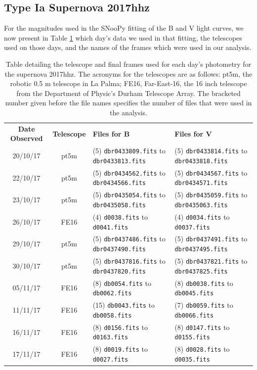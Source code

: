 \documentclass[twocolumn]{revtex4}
\begin{document}
{\subsection{Type Ia Supernova 2017hhz}
\vspace{-2ex}
For the magnitudes used in the SNooPy fitting of the B and V light curves, we now present in Table \ref{table:2017hhz_appendix_table} which day's data we used in that fitting, the telescopes used on those days, and the names of the frames which were used in our analysis. 
\begin{table}[h!]
\centering
\begin{tabularx}{\textwidth}{c@{\hskip 10pt}c@{\hskip 10pt}X X} 
 \hline
 \textbf{Date Observed} & \textbf{Telescope} & \textbf{Files for B} & \textbf{Files for V} \\ [0.5ex] 
 20/10/17 & pt5m & (5) \texttt{dbr0433809.fits} to \texttt{dbr0433813.fits} & (5) \texttt{dbr0433814.fits} to \texttt{dbr0433818.fits} \\
 22/10/17 & pt5m & (5) \texttt{dbr0434562.fits} to \texttt{dbr0434566.fits} & (5) \texttt{dbr0434567.fits} to \texttt{dbr0434571.fits} \\
 23/10/17 & pt5m & (5) \texttt{dbr0435054.fits} to \texttt{dbr0435058.fits} & (5) \texttt{dbr0435059.fits} to \texttt{dbr0435063.fits} \\
 26/10/17 & FE16 & (4) \texttt{d0038.fits} to \texttt{d0041.fits} & (4) \texttt{d0034.fits} to \texttt{d0037.fits} \\
 29/10/17 & pt5m & (5) \texttt{dbr0437486.fits} to \texttt{dbr0437490.fits} & (5) \texttt{dbr0437491.fits} to \texttt{dbr0437495.fits} \\
 30/10/17 & pt5m & (5) \texttt{dbr0437816.fits} to \texttt{dbr0437820.fits} & (5) \texttt{dbr0437821.fits} to \texttt{dbr0437825.fits} \\
 05/11/17 & FE16 & (8) \texttt{db0054.fits} to \texttt{db0062.fits} & (8) \texttt{db0038.fits} to \texttt{db0045.fits} \\
 11/11/17 & FE16 & (15) \texttt{db0043.fits} to \texttt{db0058.fits} & (7) \texttt{db0059.fits} to \texttt{db0066.fits} \\
 16/11/17 & FE16 & (8) \texttt{d0156.fits} to \texttt{d0163.fits} & (8) \texttt{d0147.fits} to \texttt{d0155.fits} \\
 17/11/17 & FE16 & (8) \texttt{d0019.fits} to \texttt{d0027.fits} & (8) \texttt{d0028.fits} to \texttt{d0035.fits} \\
 \hline
\end{tabularx}
\caption{Table detailing the telescope and final frames used for each day's photometry for the supernova 2017hhz. The acronyms for the telescopes are as follows: pt5m, the robotic 0.5 m telescope in La Palma; FE16, Far-East-16, the 16 inch telescope from the Department of Physic's Durham Telescope Array. The bracketed number given before the file names specifies the number of files that were used in the analysis.}
\vspace{-0.5em}
\label{table:2017hhz_appendix_table}
\end{table}

}
\end{document}
